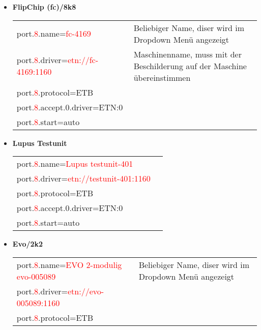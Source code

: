 	\begin{itemize}
		\item \textbf{FlipChip (fc)/8k8}
		\begin{addmargin}[0.2cm]{0cm}
			\begin{tabular}{lp{11cm}}
				port.\textcolor{red}{8}.name=\textcolor{red}{fc-4169} & \textcolor{\myGray}{Beliebiger Name, diser wird im Dropdown Menü angezeigt}\\
				port.\textcolor{red}{8}.driver=\textcolor{red}{etn://fc-4169:1160} & \textcolor{\myGray}{Maschinenname, muss mit der Beschilderung auf der Maschine übereinstimmen}\\
				port.\textcolor{red}{8}.protocol=\textcolor{\myGreen}{ETB}&\\
				port.\textcolor{red}{8}.accept.0.driver=\textcolor{\myGreen}{ETN:0}&\\
				port.\textcolor{red}{8}.start=\textcolor{\myGreen}{auto}&\\
			\end{tabular}
		\end{addmargin}
		\item \textbf{Lupus Testunit}
		\begin{addmargin}[0.2cm]{0cm}
			\begin{tabular}{lp{11cm}}
				port.\textcolor{red}{8}.name=\textcolor{red}{Lupus testunit-401} & \\
				port.\textcolor{red}{8}.driver=\textcolor{red}{etn://testunit-401:1160} &\\
				port.\textcolor{red}{8}.protocol=\textcolor{\myGreen}{ETB}&\\
				port.\textcolor{red}{8}.accept.0.driver=\textcolor{\myGreen}{ETN:0}&\\
				port.\textcolor{red}{8}.start=\textcolor{\myGreen}{auto}&\\
			\end{tabular}
		\end{addmargin}
		\item \textbf{Evo/2k2}
		\begin{addmargin}[0.2cm]{0cm}
			\begin{tabular}{lp{9cm}}
				port.\textcolor{red}{8}.name=\textcolor{red}{EVO 2-modulig evo-005089 } & \textcolor{\myGray}{Beliebiger Name, diser wird im Dropdown Menü angezeigt}\\
				port.\textcolor{red}{8}.driver=\textcolor{red}{etn://evo-005089:1160} & \\
				port.\textcolor{red}{8}.protocol=\textcolor{\myGreen}{ETB}&\\

\end{tabular}
\end{addmargin}
\end{itemize}
